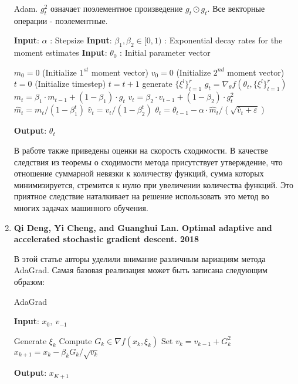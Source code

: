\documentclass[]{scrartcl}
\begin{document}
\begin{enumerate}
\begin{algorithm}[H]
	\caption{Adam. $g_t^2$ означает поэлементное произведение $g_t\odot g_t$. Все векторные операции - поэлементные.}
	\hspace*{\algorithmicindent} \textbf{Input}: $\alpha$ : Stepsize
	\hspace*{\algorithmicindent} \textbf{Input}: $\beta_1,\beta_2 \in [0,1)$ :   Exponential decay rates for the moment estimates
	\hspace*{\algorithmicindent} \textbf{Input}: $\theta_0$ : Initial parameter vector
	\begin{algorithmic}[1] 
		\STATE $m_0 = 0$ (Initialize $1^{st}$ moment vector)
		\STATE $v_0 = 0$ (Initialize $2^{nd}$ moment vector)
		\STATE $t = 0$ (Initialize timestep)
		\STATE $t=t+1 $
		\STATE generate $\{\xi^l\}_{l=1}^r$
		\STATE $g_t = \nabla_{\theta}f(\theta_t, \{\xi^l\}_{l=1}^r)$
		\STATE $m_t = \beta_1 \cdot m_{t-1} + (1-\beta_1)\cdot g_t$
		\STATE $v_t = \beta_2 \cdot v_{t-1} + (1-\beta_2)\cdot g_t^2$
		\STATE $\hat{m}_t = m_t / (1-\beta_1^t)$
		\STATE $\hat{v}_t = v_t / (1-\beta_2^t)$
		\STATE $\theta_t = \theta_{t-1} - \alpha \cdot \hat{m}_t / (\sqrt{\hat{v}_t+\varepsilon})$
		\ENDWHILE
	\end{algorithmic}
	\hspace*{\algorithmicindent} \textbf{Output}:  $\theta_t$
\end{algorithm}

В работе также приведены оценки на скорость сходимости. В качестве следствия из теоремы о сходимости метода присутствует утверждение, что отношение суммарной невязки к количеству функций, сумма которых минимизируется, стремится к нулю при увеличении количества функций. Это приятное следствие наталкивает на решение использовать это метод во многих задачах машинного обучения.

\item \textbf{Qi Deng, Yi Cheng, and Guanghui Lan. Optimal adaptive and accelerated stochastic gradient descent. 2018 \cite{deng2018optimal}}

В этой статье авторы уделили внимание различным вариациям метода AdaGrad. Самая базовая реализация может быть записана следующим образом:

\begin{algorithm}[H]
	\caption{AdaGrad}
	\hspace*{\algorithmicindent} \textbf{Input}: $x_0,~v_{-1}$
	\begin{algorithmic}[1] 
		\STATE Generate $\xi_k$
		\STATE Compute $G_k \in \nabla f(x_k, \xi_k)$
		\STATE Set $v_k = v_{k-1} + G_k^2$
		\STATE $x_{k+1} = x_k - \beta_k G_k / \sqrt{v_k}$
		\ENDFOR
	\end{algorithmic}
	\hspace*{\algorithmicindent} \textbf{Output}:  $x_{K+1}$
\end{algorithm}


\end{enumerate}
\end{document}
